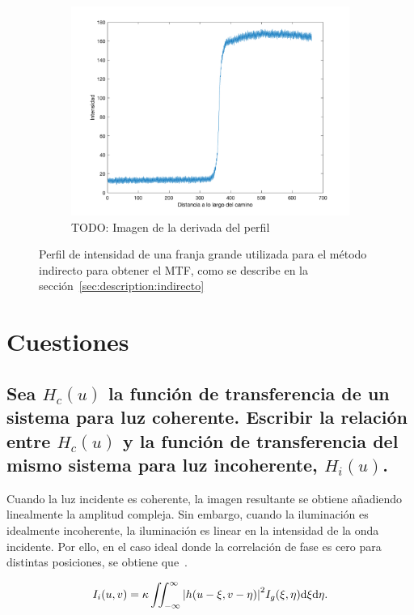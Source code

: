 \documentclass{./packages/optica-article}
\begin{document}
\begin{figure}[hptb]
\begin{subfigure}[t]{0.31\textwidth}
		\includegraphics[width=\textwidth]{edge_perfil}
		\caption{TODO: Imagen de la derivada del perfil}\label{fig:perfil:lsf}
	\end{subfigure}

	\caption{Perfil de intensidad de una franja grande utilizada para el método indirecto para obtener el MTF, como se describe en la sección~\ref{sec:description:indirecto}}\label{fig:perfil}
\end{figure}

\section{Cuestiones}

\subsection{Sea $H_{c}(u)$ la función de transferencia de un sistema para luz coherente. Escribir la relación entre $H_{c}(u)$ y la función de transferencia del mismo sistema para luz incoherente, $H_{i}(u)$.}

Cuando la luz incidente es coherente, la imagen resultante se obtiene añadiendo linealmente la amplitud compleja. Sin embargo, cuando la iluminación es idealmente incoherente, la iluminación es linear en la intensidad de la onda incidente. Por ello, en el caso ideal donde la correlación de fase es cero para distintas posiciones, se obtiene que~\cite[p.~132--134]{goodman1996introduction}.

\begin{equation}
	I_{i}(u,v) = \kappa \iint_{-\infty}^{\infty}\abs{h(u - \xi, v- \eta)}^{2} I_{g}(\xi, \eta) \dd \xi \dd \eta.
\end{equation}
\end{document}
